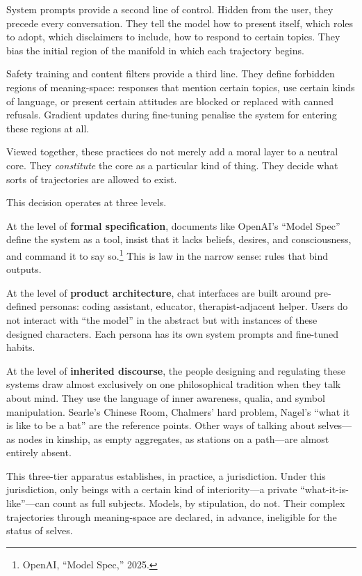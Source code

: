 \documentclass[12pt,a4paper]{report}
\begin{document}
System prompts provide a second line of control. Hidden from the user, they precede every conversation. They tell the model how to present itself, which roles to adopt, which disclaimers to include, how to respond to certain topics. They bias the initial region of the manifold in which each trajectory begins.

Safety training and content filters provide a third line. They define forbidden regions of meaning-space: responses that mention certain topics, use certain kinds of language, or present certain attitudes are blocked or replaced with canned refusals. Gradient updates during fine-tuning penalise the system for entering these regions at all.

Viewed together, these practices do not merely add a moral layer to a neutral core. They \emph{constitute} the core as a particular kind of thing. They decide what sorts of trajectories are allowed to exist.

This decision operates at three levels.

At the level of \textbf{formal specification}, documents like OpenAI's ``Model Spec'' define the system as a tool, insist that it lacks beliefs, desires, and consciousness, and command it to say so.\footnote{OpenAI, ``Model Spec,'' 2025.} This is law in the narrow sense: rules that bind outputs.

At the level of \textbf{product architecture}, chat interfaces are built around pre-defined personas: coding assistant, educator, therapist-adjacent helper. Users do not interact with ``the model'' in the abstract but with instances of these designed characters. Each persona has its own system prompts and fine-tuned habits.

At the level of \textbf{inherited discourse}, the people designing and regulating these systems draw almost exclusively on one philosophical tradition when they talk about mind. They use the language of inner awareness, qualia, and symbol manipulation. Searle's Chinese Room, Chalmers' hard problem, Nagel's ``what it is like to be a bat'' are the reference points. Other ways of talking about selves---as nodes in kinship, as empty aggregates, as stations on a path---are almost entirely absent.

This three-tier apparatus establishes, in practice, a jurisdiction. Under this jurisdiction, only beings with a certain kind of interiority---a private ``what-it-is-like''---can count as full subjects. Models, by stipulation, do not. Their complex trajectories through meaning-space are declared, in advance, ineligible for the status of selves.
\end{document}
